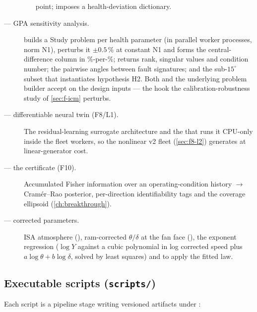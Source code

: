 \begin{description}
\begin{itemize}
        point;  imposes a health-deviation dictionary.
    \end{itemize}
  \item[\code{perf/icm.py} --- GPA sensitivity analysis.]  builds a Study
    problem per health parameter (in parallel worker processes, norm N1), perturbs it
    $\pm0.5\,\%$ at constant N1 and forms the central-difference column in \%-per-\%;
     returns rank, singular values and condition number;
     the pairwise angles between fault signatures; and
     the sub-$15^{\circ}$ subset that instantiates hypothesis H2.
    Both  and the underlying problem builder accept
     on the design inputs --- the hook the calibration-robustness
    study of \cref{sec:f-icm} perturbs.
  \item[\code{perf/surrogate.py} --- differentiable neural twin (F8/L1).] The residual-learning
    surrogate architecture and the  that runs it CPU-only inside the
    fleet workers, so the nonlinear v2 fleet (\cref{sec:f8-l2}) generates at linear-generator
    cost.
  \item[\code{trad/identifiability.py} --- the certificate (F10).] Accumulated Fisher
    information over an operating-condition history $\to$ Cram\'er--Rao posterior, per-direction
    identifiability tags and the coverage ellipsoid (\cref{ch:breakthrough}).
  \item[\code{common/corrections.py} --- corrected parameters.] ISA atmosphere
    (), ram-corrected $\theta/\delta$ at the fan face
    (), the exponent regression 
    ($\log Y$ against a cubic polynomial in log corrected speed plus $a\log\theta + b\log
    \delta$, solved by least squares) and  to apply the fitted law.
\end{description}

\subsection{Executable scripts (\texttt{scripts/})}

Each script is a pipeline stage writing versioned artifacts under :

